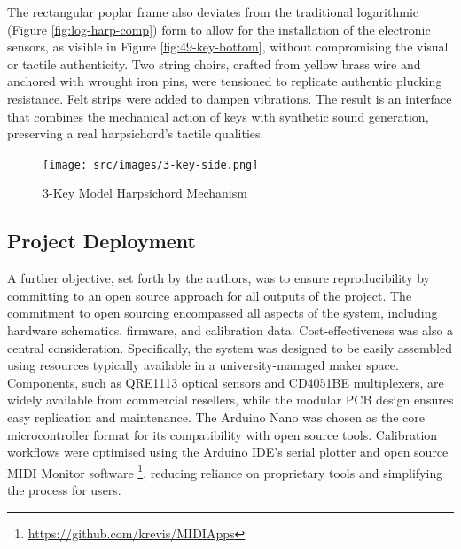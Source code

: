 The rectangular poplar frame also deviates from the traditional logarithmic (Figure \ref{fig:log-harp-comp}) form to allow for the installation of the electronic sensors, as visible in Figure \ref{fig:49-key-bottom}, without compromising the visual or tactile authenticity. Two string choirs, crafted from yellow brass wire and anchored with wrought iron pins, were tensioned to replicate authentic plucking resistance. Felt strips were added to dampen vibrations. The result is an interface that combines the mechanical action of keys with synthetic sound generation, preserving a real harpsichord's tactile qualities.

\begin{figure}[!t]
    \centering    
    \texttt{[image: src/images/3-key-side.png]}
    \caption{
    3-Key Model Harpsichord Mechanism    
    }
    \label{fig:3key}
\end{figure}

\subsection{Project Deployment}

A further objective, set forth by the authors, was to ensure reproducibility by committing to an open source approach for all outputs of the project. The commitment to open sourcing encompassed all aspects of the system, including hardware schematics, firmware, and calibration data. Cost-effectiveness was also a central consideration. 
Specifically, the system was designed to be easily assembled using resources typically available in a university-managed maker space. Components, such as QRE1113 optical sensors and CD4051BE multiplexers, are widely available from commercial resellers, while the modular PCB design ensures easy replication and maintenance. The Arduino Nano was chosen as the core microcontroller format for its compatibility with open source tools. Calibration workflows were optimised using the Arduino IDE’s serial plotter and open source MIDI Monitor software \footnote{\url{https://github.com/krevis/MIDIApps}}, reducing reliance on proprietary tools and simplifying the process for users. 




